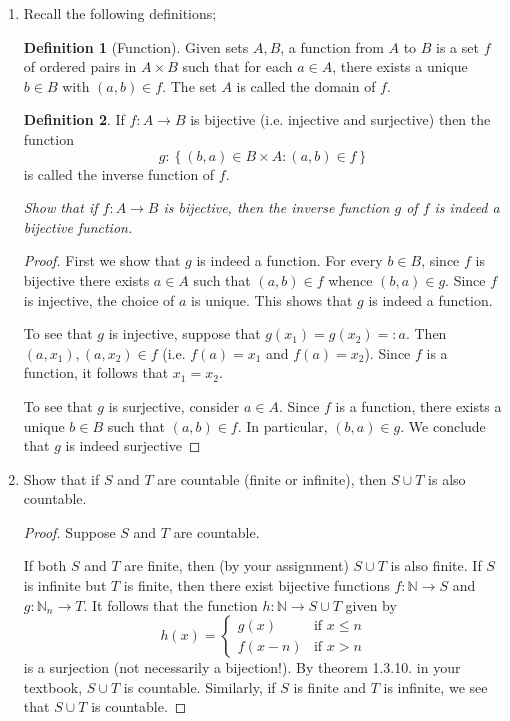 \documentclass[12pt, reqno]{article}
\numberwithin{equation}{section}
\theoremstyle{definition}
\newtheorem{def_}{Definition}
\theoremstyle{remark}
\newcommand{\NN}{\mathbb{N}}
\newcommand{\set}[1]{\left\{#1\right\}}
\begin{document}
\begin{enumerate}[leftmargin=*]
	\item Recall the following definitions;
	      \begin{def_}[Function]
		      Given sets $A, B$, a function from $A$ to $B$ is a set $f$ of ordered pairs in $A\times B$ such that for each $a\in A$, there exists a unique $b\in B$ with $(a,b)\in f$. The set $A$ is called the domain of $f$.
	      \end{def_}
	      \begin{def_}
		      If $f:A\to B$ is bijective (i.e. injective and surjective) then the function
		      \[
			      g:\set{(b,a) \in B\times A :(a,b) \in f}
		      \]
		      is called the inverse function of $f$.
	      \end{def_}
	      \emph{Show that if $f:A\to B$ is bijective, then the inverse function $g$ of $f$ is indeed a bijective function.}
	      \begin{proof}
		      First we show that $g$ is indeed a function. For every $b\in B$, since $f$ is bijective there exists $a\in A$ such that $(a,b) \in f$ whence $(b,a)\in g$. Since $f$ is injective, the choice of $a$ is unique. This shows that $g$ is indeed a function.

		      To see that $g$ is injective, suppose that $g(x_1) = g(x_2) =: a$. Then $(a, x_1), (a,x_2)\in f$ (i.e. $f(a) = x_1$ and $f(a) = x_2$). Since $f$ is a function, it follows that $x_1 = x_2$.

		      To see that $g$ is surjective, consider $a\in A$. Since $f$ is a function, there exists a unique $b\in B$ such that $(a,b)\in f$. In particular, $(b,a) \in g$. We conclude that $g$ is indeed surjective
	      \end{proof}

	\item Show that if $S$ and $T$ are countable (finite or infinite), then $S\cup T$ is also countable.

	      \begin{proof}
		      Suppose $S$ and $T$ are countable.

		      If both $S$ and $T$ are finite, then (by your assignment) $S\cup T$ is also finite. If $S$ is infinite but $T$ is finite, then there exist bijective functions $f:\NN\to S$ and $g:\NN_n \to T$. It follows that the function $h: \NN\to S\cup T$ given by
		      \[
			      h(x) = \begin{cases}
				      g(x)   & \text{if } x\leq n \\
				      f(x-n) & \text{if }x>n
			      \end{cases}
		      \]
		      is a surjection (not necessarily a bijection!). By theorem 1.3.10. in your textbook, $S\cup T$ is countable.
		      Similarly, if $S$ is finite and $T$ is infinite, we see that $S\cup T$ is countable.


\end{proof}
\end{enumerate}
\end{document}
